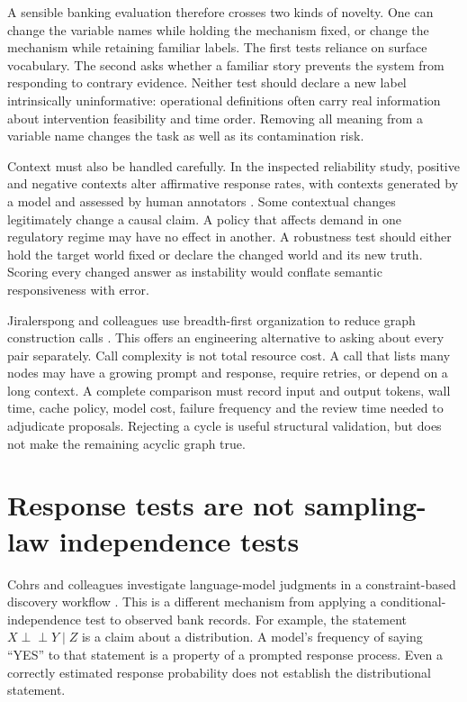 A sensible banking evaluation therefore crosses two kinds of novelty. One can
change the variable names while holding the mechanism fixed, or change the
mechanism while retaining familiar labels. The first tests reliance on
surface vocabulary. The second asks whether a familiar story prevents the
system from responding to contrary evidence. Neither test should declare a
new label intrinsically uninformative: operational definitions often carry
real information about intervention feasibility and time order. Removing all
meaning from a variable name changes the task as well as its contamination risk.

Context must also be handled carefully. In the inspected reliability study,
positive and negative contexts alter affirmative response rates, with contexts
generated by a model and assessed by human annotators
\cite{v12_la_2407_19638}. Some contextual changes legitimately change a causal
claim. A policy that affects demand in one regulatory regime may have no effect
in another. A robustness test should either hold the target world fixed or
declare the changed world and its new truth. Scoring every changed answer as
instability would conflate semantic responsiveness with error.

Jiralerspong and colleagues use breadth-first organization to reduce graph
construction calls \cite{v12_la_2402_01207}. This offers an engineering
alternative to asking about every pair separately. Call complexity is not total
resource cost. A call that lists many nodes may have a growing prompt and
response, require retries, or depend on a long context. A complete comparison
must record input and output tokens, wall time, cache policy, model cost,
failure frequency and the review time needed to adjudicate proposals. Rejecting
a cycle is useful structural validation, but does not make the remaining
acyclic graph true.

\section{Response tests are not sampling-law independence tests}

Cohrs and colleagues investigate language-model judgments in a
constraint-based discovery workflow \cite{v12_la_2406_07378}. This is a
different mechanism from applying a conditional-independence test to observed
bank records. For example, the statement
$X\mathrel{\perp\!\!\!\perp}Y\mid Z$ is a claim about a distribution. A
model's frequency of saying ``YES'' to that statement is a property of a
prompted response process. Even a correctly estimated response probability
does not establish the distributional statement.

